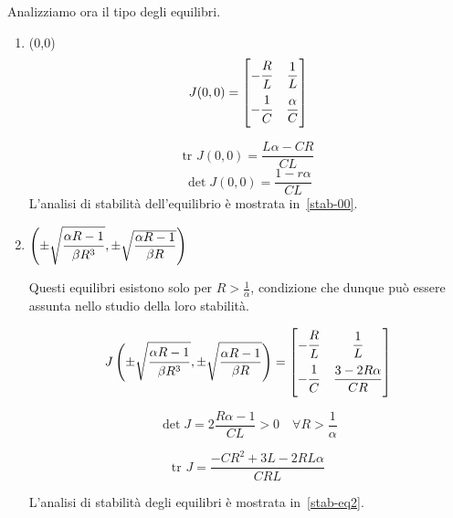 Analizziamo ora il tipo degli equilibri.
\begin{enumerate}
\item (0,0)\\
\begin{equation}
    J(0,0) =
    \begin{bmatrix}
    -\dfrac{\strut R}{L\strut} & \dfrac{1}{L} \\
    -\dfrac{\strut 1}{C\strut} & \dfrac{\alpha}{C} \\
    \end{bmatrix}
\end{equation}

\begin{equation}
\textrm{tr } J(0,0) = \frac{L\alpha-CR}{CL}
\end{equation}
\begin{equation}
\det J(0,0) = \frac{1-r\alpha}{CL}
\end{equation}
L'analisi di stabilità dell'equilibrio è mostrata in~\autoref{stab-00}.

\item $\left( \pm \sqrt{\dfrac{\strut\alpha R -1}{\strut\beta R^3}}, \pm \sqrt{\dfrac{\alpha R -1}{\beta R}} \right)$

Questi equilibri esistono solo per $R > \frac{1}{\alpha}$, condizione che dunque può essere assunta nello studio della loro stabilità.

\begin{equation}
    J\left( \pm \sqrt{\dfrac{\strut\alpha R -1}{\strut\beta R^3}}, \pm \sqrt{\dfrac{\alpha R -1}{\beta R}} \right) =
    \begin{bmatrix}
        -\dfrac{R\strut}{L\strut} & \dfrac{1}{L} \\
        -\dfrac{1\strut}{C\strut} & \dfrac{3-2R\alpha}{CR} \\
    \end{bmatrix}
\end{equation}

\begin{equation}
    \det J = 2 \dfrac{R\alpha-1}{CL} > 0 \quad \forall R > \frac{1}{\alpha}
\end{equation}

\begin{equation}
    \textrm{tr } J = \dfrac{-CR^2+3L-2RL\alpha}{CRL}
\end{equation}

L'analisi di stabilità degli equilibri è mostrata in~\autoref{stab-eq2}.


\end{enumerate}
